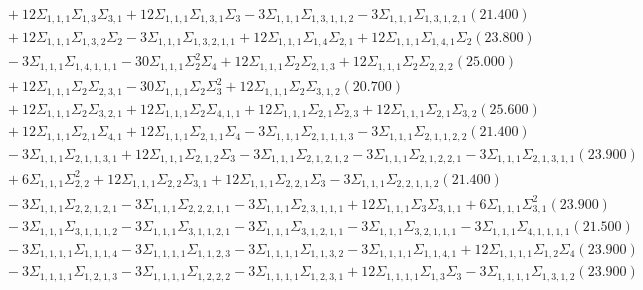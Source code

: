 \documentclass[12pt]{article}
\begin{document}
\begin{landscape}
\begin{align*}
		&\quad\quad +12\Sigma_{1,1,1}\Sigma_{1,3}\Sigma_{3,1}+12\Sigma_{1,1,1}\Sigma_{1,3,1}\Sigma_{3}-3\Sigma_{1,1,1}\Sigma_{1,3,1,1,2}-3\Sigma_{1,1,1}\Sigma_{1,3,1,2,1}(21.400) \\ 
		&\quad\quad +12\Sigma_{1,1,1}\Sigma_{1,3,2}\Sigma_{2}-3\Sigma_{1,1,1}\Sigma_{1,3,2,1,1}+12\Sigma_{1,1,1}\Sigma_{1,4}\Sigma_{2,1}+12\Sigma_{1,1,1}\Sigma_{1,4,1}\Sigma_{2}(23.800) \\ 
		&\quad\quad -3\Sigma_{1,1,1}\Sigma_{1,4,1,1,1}-30\Sigma_{1,1,1}\Sigma_{2}^{2}\Sigma_{4}+12\Sigma_{1,1,1}\Sigma_{2}\Sigma_{2,1,3}+12\Sigma_{1,1,1}\Sigma_{2}\Sigma_{2,2,2}(25.000) \\ 
		&\quad\quad +12\Sigma_{1,1,1}\Sigma_{2}\Sigma_{2,3,1}-30\Sigma_{1,1,1}\Sigma_{2}\Sigma_{3}^{2}+12\Sigma_{1,1,1}\Sigma_{2}\Sigma_{3,1,2}(20.700) \\ 
		&\quad\quad +12\Sigma_{1,1,1}\Sigma_{2}\Sigma_{3,2,1}+12\Sigma_{1,1,1}\Sigma_{2}\Sigma_{4,1,1}+12\Sigma_{1,1,1}\Sigma_{2,1}\Sigma_{2,3}+12\Sigma_{1,1,1}\Sigma_{2,1}\Sigma_{3,2}(25.600) \\ 
		&\quad\quad +12\Sigma_{1,1,1}\Sigma_{2,1}\Sigma_{4,1}+12\Sigma_{1,1,1}\Sigma_{2,1,1}\Sigma_{4}-3\Sigma_{1,1,1}\Sigma_{2,1,1,1,3}-3\Sigma_{1,1,1}\Sigma_{2,1,1,2,2}(21.400) \\ 
		&\quad\quad -3\Sigma_{1,1,1}\Sigma_{2,1,1,3,1}+12\Sigma_{1,1,1}\Sigma_{2,1,2}\Sigma_{3}-3\Sigma_{1,1,1}\Sigma_{2,1,2,1,2}-3\Sigma_{1,1,1}\Sigma_{2,1,2,2,1}-3\Sigma_{1,1,1}\Sigma_{2,1,3,1,1}(23.900) \\ 
		&\quad\quad +6\Sigma_{1,1,1}\Sigma_{2,2}^{2}+12\Sigma_{1,1,1}\Sigma_{2,2}\Sigma_{3,1}+12\Sigma_{1,1,1}\Sigma_{2,2,1}\Sigma_{3}-3\Sigma_{1,1,1}\Sigma_{2,2,1,1,2}(21.400) \\ 
		&\quad\quad -3\Sigma_{1,1,1}\Sigma_{2,2,1,2,1}-3\Sigma_{1,1,1}\Sigma_{2,2,2,1,1}-3\Sigma_{1,1,1}\Sigma_{2,3,1,1,1}+12\Sigma_{1,1,1}\Sigma_{3}\Sigma_{3,1,1}+6\Sigma_{1,1,1}\Sigma_{3,1}^{2}(23.900) \\ 
		&\quad\quad -3\Sigma_{1,1,1}\Sigma_{3,1,1,1,2}-3\Sigma_{1,1,1}\Sigma_{3,1,1,2,1}-3\Sigma_{1,1,1}\Sigma_{3,1,2,1,1}-3\Sigma_{1,1,1}\Sigma_{3,2,1,1,1}-3\Sigma_{1,1,1}\Sigma_{4,1,1,1,1}(21.500) \\ 
		&\quad\quad -3\Sigma_{1,1,1,1}\Sigma_{1,1,1,4}-3\Sigma_{1,1,1,1}\Sigma_{1,1,2,3}-3\Sigma_{1,1,1,1}\Sigma_{1,1,3,2}-3\Sigma_{1,1,1,1}\Sigma_{1,1,4,1}+12\Sigma_{1,1,1,1}\Sigma_{1,2}\Sigma_{4}(23.900) \\ 
		&\quad\quad -3\Sigma_{1,1,1,1}\Sigma_{1,2,1,3}-3\Sigma_{1,1,1,1}\Sigma_{1,2,2,2}-3\Sigma_{1,1,1,1}\Sigma_{1,2,3,1}+12\Sigma_{1,1,1,1}\Sigma_{1,3}\Sigma_{3}-3\Sigma_{1,1,1,1}\Sigma_{1,3,1,2}(23.900) \\ 

\end{align*}
\end{landscape}
\end{document}
